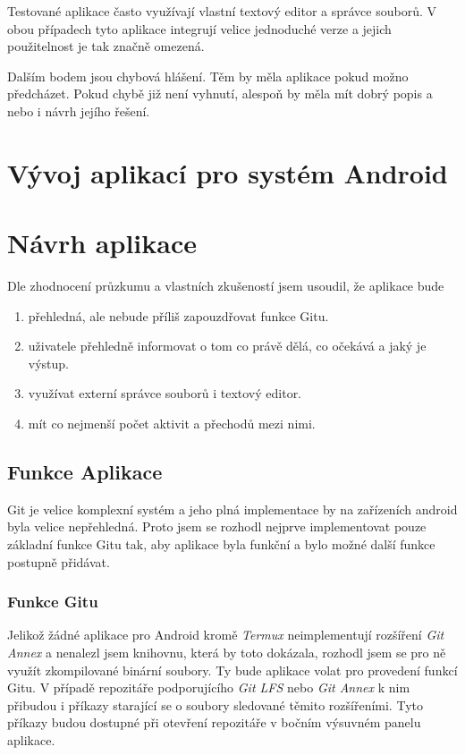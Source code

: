     Testované aplikace často využívají vlastní textový editor a správce souborů. V obou případech tyto aplikace integrují velice jednoduché verze a jejich použitelnost je tak značně omezená.

    Dalším bodem jsou chybová hlášení. Těm by měla aplikace pokud možno předcházet. Pokud chybě již není vyhnutí, alespoň by měla mít dobrý popis a nebo i návrh jejího řešení.

\chapter{Vývoj aplikací pro systém Android}

\chapter{Návrh aplikace}
    Dle zhodnocení průzkumu a vlastních zkušeností jsem usoudil, že aplikace bude
    \begin{enumerate}
        \item přehledná, ale nebude příliš zapouzdřovat funkce Gitu.
        \item uživatele přehledně informovat o tom co právě dělá, co očekává a jaký je výstup.
        \item využívat externí správce souborů i textový editor.
        \item mít co nejmenší počet aktivit a přechodů mezi nimi.
    \end{enumerate}

    \section{Funkce Aplikace}
        Git je velice komplexní systém a jeho plná implementace by na zařízeních android byla velice nepřehledná. Proto jsem se rozhodl nejprve implementovat pouze základní funkce Gitu tak, aby aplikace byla funkční a bylo možné další funkce postupně přidávat.

        \subsection{Funkce Gitu}
        Jelikož žádné aplikace pro Android kromě \emph{Termux} neimplementují rozšíření \emph{Git Annex} a nenalezl jsem knihovnu, která by toto dokázala, rozhodl jsem se pro ně využít zkompilované binární soubory. Ty bude aplikace volat pro provedení funkcí Gitu.
        V případě repozitáře podporujícího \emph{Git LFS} nebo \emph{Git Annex} k nim přibudou i příkazy starající se o soubory sledované těmito rozšířeními. Tyto příkazy budou dostupné při otevření repozitáře v bočním výsuvném panelu aplikace.

